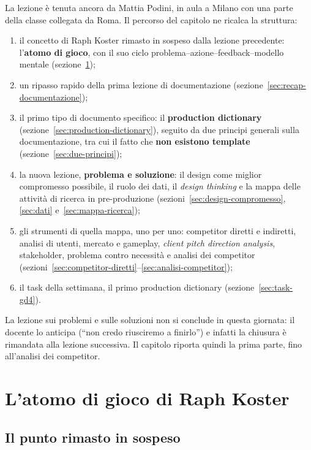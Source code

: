 La lezione è tenuta ancora da Mattia Podini, in aula a Milano con una parte
della classe collegata da Roma. Il percorso del capitolo ne ricalca la
struttura:
\begin{enumerate}
  \item il concetto di Raph Koster rimasto in sospeso dalla lezione
        precedente: l'\textbf{atomo di gioco}, con il suo ciclo
        problema--azione--feedback--modello mentale
        (sezione~\ref{sec:atomo-koster});
  \item un ripasso rapido della prima lezione di documentazione
        (sezione~\ref{sec:recap-documentazione});
  \item il primo tipo di documento specifico: il \textbf{production
        dictionary} (sezione~\ref{sec:production-dictionary}), seguito da due
        principi generali sulla documentazione, tra cui il fatto che
        \textbf{non esistono template} (sezione~\ref{sec:due-principi});
  \item la nuova lezione, \textbf{problema e soluzione}: il design come
        miglior compromesso possibile, il ruolo dei dati, il \emph{design
        thinking} e la mappa delle attività di ricerca in pre-produzione
        (sezioni~\ref{sec:design-compromesso}, \ref{sec:dati}
        e~\ref{sec:mappa-ricerca});
  \item gli strumenti di quella mappa, uno per uno: competitor diretti e
        indiretti, analisi di utenti, mercato e gameplay, \emph{client pitch
        direction analysis}, stakeholder, problema contro necessità e analisi
        dei competitor (sezioni~\ref{sec:competitor-diretti}--\ref{sec:analisi-competitor});
  \item il task della settimana, il primo production dictionary
        (sezione~\ref{sec:task-gd4}).
\end{enumerate}

La lezione sui problemi e sulle soluzioni non si conclude in questa giornata:
il docente lo anticipa (``non credo riusciremo a finirlo'') e infatti la
chiusura è rimandata alla lezione successiva. Il capitolo riporta quindi la
prima parte, fino all'analisi dei competitor.

\section{L'atomo di gioco di Raph Koster}
\label{sec:atomo-koster}

\subsection{Il punto rimasto in sospeso}

